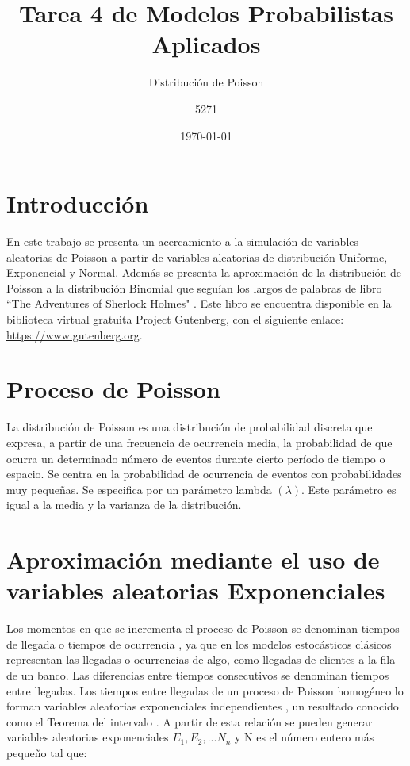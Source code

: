 \documentclass{article}
\title{Tarea 4 de Modelos Probabilistas Aplicados}
\subtitle{Distribución de Poisson}
\author{5271}
\date{\today}
\begin{document}
\maketitle

\section{Introducción}

En este trabajo se presenta un acercamiento a la simulación de variables aleatorias de Poisson a partir de variables aleatorias de distribución Uniforme, Exponencial y Normal. Además se presenta la aproximación de la distribución de Poisson a la distribución Binomial que seguían los largos de palabras de libro ``The Adventures of Sherlock Holmes" \cite{Holmes92}. Este libro se encuentra disponible en la biblioteca virtual gratuita Project Gutenberg, con el siguiente enlace: \href{https://www.gutenberg.org}{https://www.gutenberg.org}. 

\section{Proceso de Poisson}

La distribución de Poisson es una distribución de probabilidad discreta que expresa, a partir de una frecuencia de ocurrencia media, la probabilidad de que ocurra un determinado número de eventos durante cierto período de tiempo o espacio. Se centra en la probabilidad de ocurrencia de eventos con probabilidades muy pequeñas. Se especifica por un parámetro lambda $(\lambda)$. Este parámetro es igual a la media y la varianza de la distribución. 

\section{Aproximación mediante el uso de variables aleatorias Exponenciales }

Los momentos en que se incrementa el proceso de Poisson se denominan tiempos de llegada o tiempos de ocurrencia , ya que en los modelos estocásticos clásicos representan las llegadas o ocurrencias de algo, como llegadas de clientes a la fila de un banco. Las diferencias entre tiempos consecutivos se denominan tiempos entre llegadas. Los tiempos entre llegadas de un proceso de Poisson homogéneo lo forman variables aleatorias exponenciales independientes , un resultado conocido como el Teorema del intervalo . A partir de esta relación se pueden generar variables aleatorias exponenciales $E_{1}, E_{2},...N_{n}$ y N es el número entero más pequeño tal que:
\end{document}

